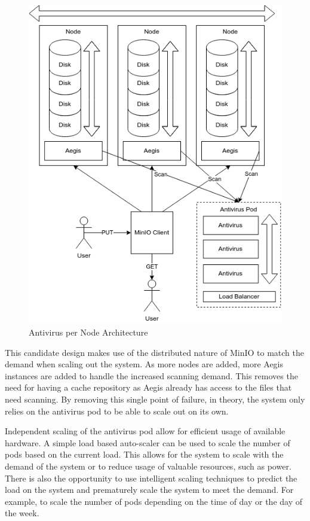 \documentclass[12pt, conference, final, a4paper, onecolumn, compsoc]{IEEEtran}
\begin{document}
\begin{figure}
  \centering \includegraphics[scale=.4]{diagrams/per-node.png}
  \caption{Antivirus per Node Architecture}
  \label{fig:perNodeArch}
\end{figure}

This candidate design makes use of the distributed nature of MinIO to match the
demand when scaling out the system. As more nodes are added, more Aegis
instances are added to handle the increased scanning demand. This removes the
need for having a cache repository as Aegis already has access to the files that
need scanning. By removing this single point of failure, in theory, the system
only relies on the antivirus pod to be able to scale out on its own.

Independent scaling of the antivirus pod allow for efficient usage of available
hardware. A simple load based auto-scaler can be used to scale the number of
pods based on the current load. This allows for the system to scale with the
demand of the system or to reduce usage of valuable resources, such as power.
There is also the opportunity to use intelligent scaling techniques to predict
the load on the system and prematurely scale the system to meet the demand. For
example, to scale the number of pods depending on the time of day or the day of
the week.
\end{document}
